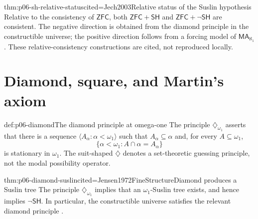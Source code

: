 \begin{hbtheorem}{thm:p06-sh-relative-status}{cited=Jech2003}{Relative status of the Suslin hypothesis}
Relative to the consistency of \(\mathsf{ZFC}\), both
\(\mathsf{ZFC}+\mathsf{SH}\) and
\(\mathsf{ZFC}+\neg\mathsf{SH}\) are consistent.  The negative direction is
obtained from the diamond principle in the constructible universe; the
positive direction follows from a forcing model of
\(\mathsf{MA}_{\aleph_1}\).  These relative-consistency constructions are
cited, not reproduced locally.
\end{hbtheorem}

\section{Diamond, square, and Martin's axiom}
\label{sec:p06-combinatorial-principles}

\begin{hbdefinition}{def:p06-diamond}{The diamond principle at omega-one}
The principle \(\diamondsuit_{\omega_1}\) asserts that there is a sequence
\(\langle A_\alpha:\alpha<\omega_1\rangle\) such that
\(A_\alpha\subseteq\alpha\) and, for every \(A\subseteq\omega_1\),
\[
  \{\alpha<\omega_1:A\cap\alpha=A_\alpha\}
\]
is stationary in \(\omega_1\).  The suit-shaped \(\diamondsuit\) denotes a
set-theoretic guessing principle, not the modal possibility operator.
\end{hbdefinition}

\begin{hbtheorem}{thm:p06-diamond-suslin}{cited=Jensen1972FineStructure}{Diamond produces a Suslin tree}
The principle \(\diamondsuit_{\omega_1}\) implies that an
\(\omega_1\)-Suslin tree exists, and hence implies
\(\neg\mathsf{SH}\).  In particular, the constructible universe satisfies
the relevant diamond principle \cite{Jensen1972FineStructure}.
\end{hbtheorem}


